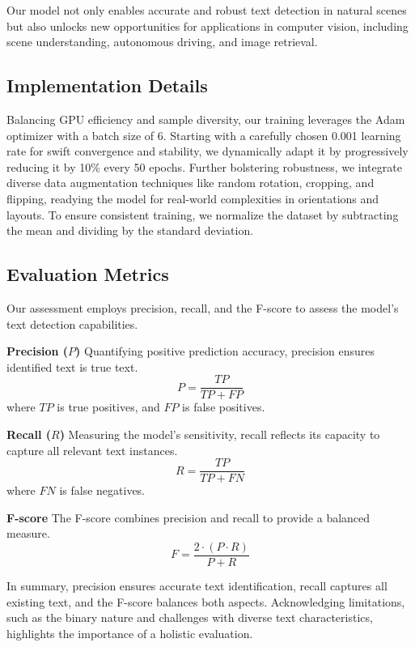 \documentclass[default,iicol]{sn-jnl}%
\begin{document}
Our model not only enables accurate and robust text detection in natural scenes but also unlocks new opportunities for applications in computer vision, including scene understanding, autonomous driving, and image retrieval.

\subsection{Implementation Details}
Balancing GPU efficiency and sample diversity, our training leverages the Adam optimizer with a batch size of 6. Starting with a carefully chosen 0.001 learning rate for swift convergence and stability, we dynamically adapt it by progressively reducing it by 10\% every 50 epochs. Further bolstering robustness, we integrate diverse data augmentation techniques like random rotation, cropping, and flipping, readying the model for real-world complexities in orientations and layouts. To ensure consistent training, we normalize the dataset by subtracting the mean and dividing by the standard deviation.


\subsection{Evaluation Metrics}

Our assessment employs precision, recall, and the F-score to assess the model's text detection capabilities.

\textbf{Precision (\(P\))}
Quantifying positive prediction accuracy, precision ensures identified text is true text. 
\begin{equation}
	P = \frac{TP}{TP + FP}
\end{equation} 
where \( TP \) is true positives, and \( FP \) is false positives.

\textbf{Recall (\(R\))}
Measuring the model's sensitivity, recall reflects its capacity to capture all relevant text instances.
\begin{equation}
	R = \frac{TP}{TP + FN}
\end{equation}
where \( FN \) is false negatives.
 
\textbf{F-score}
The F-score combines precision and recall to provide a balanced measure. 
\begin{equation}
	F = \frac{2 \cdot (P \cdot R)}{P + R}
\end{equation}

In summary, precision ensures accurate text identification, recall captures all existing text, and the F-score balances both aspects. Acknowledging limitations, such as the binary nature and challenges with diverse text characteristics, highlights the importance of a holistic evaluation.
\end{document}
